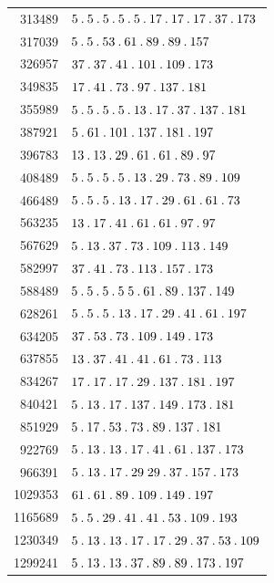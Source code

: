 \begin{longtable}{@{}r|l@{}}
313489 & $5\pdot 5\pdot 5\pdot 5\pdot 5\pdot 17\pdot 17\pdot 17\pdot 37\pdot 173$\\
317039 & $5\pdot 5\pdot 53\pdot 61\pdot 89\pdot 89\pdot 157$\\
326957 & $37\pdot 37\pdot 41\pdot 101\pdot 109\pdot 173$\\
349835 & $17\pdot 41\pdot 73\pdot 97\pdot 137\pdot 181$\\
355989 & $5\pdot 5\pdot 5\pdot 5\pdot 13\pdot 17\pdot 37\pdot 137\pdot 181$\\
387921 & $5\pdot 61\pdot 101\pdot 137\pdot 181\pdot 197$\\
396783 & $13\pdot 13\pdot 29\pdot 61\pdot 61\pdot 89\pdot 97$\\
408489 & $5\pdot 5\pdot 5\pdot 5\pdot 13\pdot 29\pdot 73\pdot 89\pdot 109$\\
466489 & $5\pdot 5\pdot 5\pdot 13\pdot 17\pdot 29\pdot 61\pdot 61\pdot 73$\\
563235 & $13\pdot 17\pdot 41\pdot 61\pdot 61\pdot 97\pdot 97$\\
567629 & $5\pdot 13\pdot 37\pdot 73\pdot 109\pdot 113\pdot 149$\\
582997 & $37\pdot 41\pdot 73\pdot 113\pdot 157\pdot 173$\\
588489 & $5\pdot 5\pdot 5\pdot 5\;5\pdot 61\pdot 89\pdot 137\pdot 149$\\
628261 & $5\pdot 5\pdot 5\pdot 13\pdot 17\pdot 29\pdot 41\pdot 61\pdot 197$\\
634205 & $37\pdot 53\pdot 73\pdot 109\pdot 149\pdot 173$\\
637855 & $13\pdot 37\pdot 41\pdot 41\pdot 61\pdot 73\pdot 113$\\
834267 & $17\pdot 17\pdot 17\pdot 29\pdot 137\pdot 181\pdot 197$\\
840421 & $5\pdot 13\pdot 17\pdot 137\pdot 149\pdot 173\pdot 181$\\
851929 & $5\pdot 17\pdot 53\pdot 73\pdot 89\pdot 137\pdot 181$\\
922769 & $5\pdot 13\pdot 13\pdot 17\pdot 41\pdot 61\pdot 137\pdot 173$\\
966391 & $5\pdot 13\pdot 17\pdot 29\;29\pdot 37\pdot 157\pdot 173$\\
1029353 & $61\pdot 61\pdot 89\pdot 109\pdot 149\pdot 197$\\
1165689 & $5\pdot 5\pdot 29\pdot 41\pdot 41\pdot 53\pdot 109\pdot 193$\\
1230349 & $5\pdot 13\pdot 13\pdot 17\pdot 17\pdot 29\pdot 37\pdot 53\pdot 109$\\
1299241 & $5\pdot 13\pdot 13\pdot 37\pdot 89\pdot 89\pdot 173\pdot 197$\\

\end{longtable}
